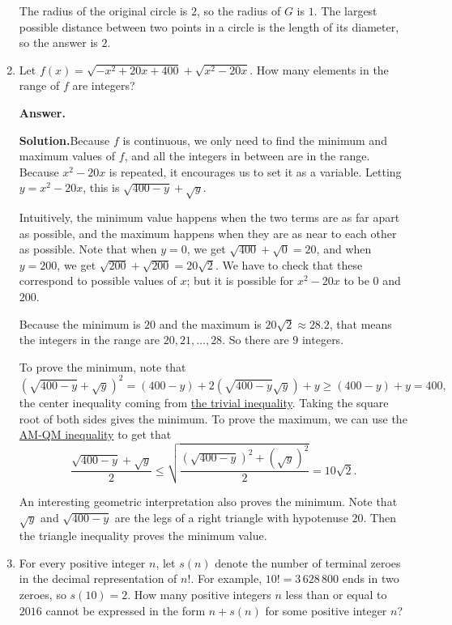 \documentclass[11pt,paper=letter]{scrartcl}
\newcommand{\ans}{{\sffamily \bfseries Answer.}\;}
\newcommand{\sol}{{\sffamily \bfseries Solution.}\;}
\newenvironment{rem}%
{\noindent \ignorespaces \small \sffamily \sansmath {\bfseries Remark.}}%
{\ignorespacesafterend}
\begin{document}
\begin{enumerate}[left=0pt]
The radius of the original circle is $2$, so the radius of $G$ is $1$. The largest possible distance between two points in a circle is the length of its diameter, so the answer is $2$.

\item Let $f(x) = \sqrt{-x^2 + 20x + 400} + \sqrt{x^2 - 20x}$. How many elements in the range of $f$ are integers?

\ans{$9$}

\sol Because $f$ is continuous, we only need to find the minimum and maximum values of $f$, and all the integers in between are in the range. Because $x^2 - 20x$ is repeated, it encourages us to set it as a variable. Letting $y = x^2 - 20x$, this is $\sqrt{400 - y} + \sqrt{y}$.

Intuitively, the minimum value happens when the two terms are as far apart as possible, and the maximum happens when they are as near to each other as possible. Note that when $y = 0$, we get $\sqrt{400} + \sqrt{0} = 20$, and when $y = 200$, we get $\sqrt{200} + \sqrt{200} = 20\sqrt{2}$. We have to check that these correspond to possible values of $x$; but it is possible for $x^2 - 20x$ to be $0$ and $200$.

Because the minimum is $20$ and the maximum is $20\sqrt{2} \approx 28.2$, that means the integers in the range are $20, 21, \ldots, 28$. So there are $9$ integers.

To prove the minimum, note that \[
\left(\sqrt{400 - y} + \sqrt{y}\right)^2
= (400 - y) + 2\left(\sqrt{400 - y}\sqrt{y}\right) + y
\ge (400 - y) + y = 400,
\]
the center inequality coming from \href{https://artofproblemsolving.com/wiki/index.php/Trivial_Inequality}{the trivial inequality}. Taking the square root of both sides gives the minimum. To prove the maximum, we can use the \href{https://en.wikipedia.org/wiki/HM-GM-AM-QM_inequalities}{AM-QM inequality} to get that \[
\frac{\sqrt{400 - y} + \sqrt{y}}{2} \le \sqrt{\frac{\left(\sqrt{400 - y}\right)^2 + \left(\sqrt{y}\right)^2}{2}} = 10\sqrt{2}.
\]

\begin{rem}
An interesting geometric interpretation also proves the minimum. Note that $\sqrt{y}$ and $\sqrt{400 - y}$ are the legs of a right triangle with hypotenuse $20$. Then the triangle inequality proves the minimum value.
\end{rem}

\item For every positive integer $n$, let $s(n)$ denote the number of terminal zeroes in the decimal representation of $n!$. For example, $10! = 3\,628\,800$ ends in two zeroes, so $s(10) = 2$. How many positive integers $n$ less than or equal to $2016$ cannot be expressed in the form $n + s(n)$ for some positive integer $n$?


\end{enumerate}
\end{document}
